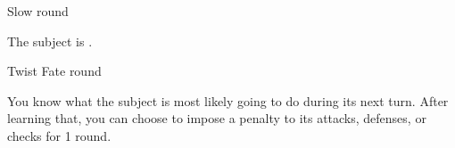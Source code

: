 \begin{spellsection}[Lesser]{Slow}
     round
    \begin{spelleffect}
        The subject is \slowed.
    \end{spelleffect}
\end{spellsection}

\begin{spellsection}{Twist Fate}
     round
    \begin{spelleffect}
        You know what the subject is most likely going to do during its next turn. After learning that, you can choose to impose a  penalty to its attacks, defenses, or checks for 1 round.
    \end{spelleffect}
\end{spellsection}
